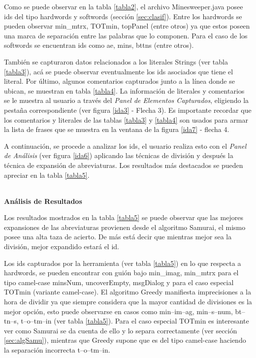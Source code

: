 \documentclass[a4paper,12pt]{report}
\begin{document}
Como se puede observar en la tabla \ref{tabla2}, el archivo \mbox{Minesweeper.java} posee ids del tipo hardwords y softwords (sección \ref{sec:clasif}). Entre los hardwords se pueden observar \textsf{min\_mtrx}, \textsf{TOTmin}, \textsf{topPanel} (entre otros) ya que estos poseen una marca de separación entre las palabras que lo componen. Para el caso de los softwords se encuentran ids como \textsf{ae}, \textsf{mins}, \textsf{bttns} (entre otros).

También se capturaron datos relacionados a los literales Strings (ver tabla \ref{tabla3}), acá se puede observar eventualmente los ids asociados que tiene el literal.
Por último, algunos comentarios capturados junto a la línea donde se ubican, se muestran en tabla \ref{tabla4}. La información de literales y comentarios se le muestra al usuario a través del \textit{Panel de Elementos Capturados}, eligiendo la pestaña correspondiente (ver figura \ref{ida3} - Flecha 3). Es importante recordar que los comentarios y literales de las tablas \ref{tabla3} y \ref{tabla4} son usados para armar la lista de frases que se muestra en la ventana de la figura \ref{ida7} - flecha 4.

A continuación, se procede a analizar los ids, el usuario realiza esto con el \textit{Panel de Análisis} (ver figura \ref{ida6}) aplicando las técnicas de división y después la técnica de expansión de abreviaturas. Los resultados más destacados se pueden apreciar en la tabla \ref{tabla5}.

\noindent \textbf{\\Análisis de Resultados\\}

Los resultados mostrados en la tabla \ref{tabla5} se puede observar que las mejores expansiones de las abreviaturas provienen desde el algoritmo Samurai, el mismo posee una alta taza de acierto. De más está decir que mientras mejor sea la división, mejor expandido estará el id.

Los ids capturados por la herramienta (ver tabla \ref{tabla5}) en lo que respecta a hardwords, se pueden encontrar con guión bajo  \textsf{min\_imag}, \textsf{min\_mtrx}  para el tipo camel-case \textsf{minsNum}, \textsf{uncoverEmpty}, \mbox{\textsf{msgDialog}} y para el caso especial \textsf{TOTmin} (variante camel-case). El algoritmo Greedy manifiesta imprecisiones a la hora de dividir ya que siempre considera que la mayor cantidad de divisiones es la mejor opción, esto puede observarse en casos como \textsf{min--im--ag}, \textsf{min--s--num}, \textsf{bt--tn--s}, \textsf{t--o--tm--in} (ver tabla \ref{tabla5}). Para el caso especial \textsf{TOTmin} es interesante ver como Samurai se da cuenta de ello y lo separa correctamente (ver sección \ref{sec:algSamu}), mientras que Greedy supone que es del tipo camel-case haciendo la separación incorrecta \textsf{t--o--tm--in}.
\end{document}
